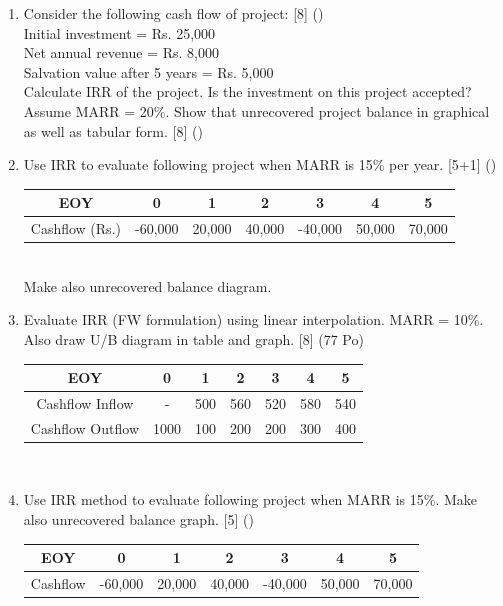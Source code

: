 \documentclass[12pt]{article}
\begin{document}
\begin{enumerate}[noitemsep, topsep = 0pt]
		\item Consider the following cash flow of project: \hfill [8] ()\\
		Initial investment = Rs. 25,000\\
		Net annual revenue = Rs. 8,000\\
		Salvation value after 5 years = Rs. 5,000\\
		Calculate IRR of the project. Is the investment on this project accepted?\\
		Assume MARR = 20\%. Show that unrecovered project balance in graphical as well as tabular form. \hfill [8] ()
		
		\item Use IRR to evaluate following project when MARR is 15\% per year. \hfill [5+1] ()\\
		\begin{tabular}{|c|c|c|c|c|c|c|}
			\hline
			EOY & 0 & 1 & 2 & 3 & 4 & 5\\ \hline
			Cashflow (Rs.) & -60,000 & 20,000 & 40,000 & -40,000 & 50,000 & 70,000\\ \hline
		\end{tabular}\\[0pt]
		Make also unrecovered balance diagram.
		
		\item Evaluate IRR (FW formulation) using linear interpolation. MARR = 10\%. Also draw U/B diagram in table and graph. \hfill [8] (77 Po)\\
		\begin{tabular}{|c|c|c|c|c|c|c|}
			\hline
			EOY & 0 & 1 & 2 & 3 & 4 & 5\\ \hline
			Cashflow Inflow & - & 500 & 560 & 520 & 580 & 540\\ \hline
			Cashflow Outflow & 1000 & 100 & 200 & 200 & 300 & 400\\ \hline
		\end{tabular}\\[0pt]
		
		\item Use IRR method to evaluate following project when MARR is 15\%. Make also unrecovered balance graph. \hfill [5] ()\\
		\begin{tabular}{|c|c|c|c|c|c|c|}
			\hline
			EOY & 0 & 1 & 2 & 3 & 4 & 5\\ \hline
			Cashflow & -60,000 & 20,000 & 40,000 & -40,000 & 50,000 & 70,000\\ \hline
		\end{tabular}\\[0pt]
		

\end{enumerate}
\end{document}
